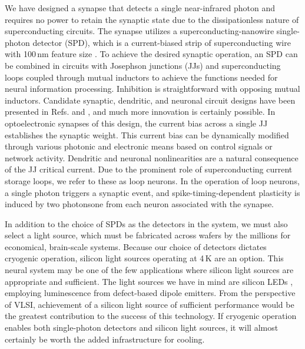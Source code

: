 \documentclass[twocolumn]{article}
\newcommand{\onlinecite}[1]{\hspace{-1 ex} \nocite{#1}\citenum{#1}}
\begin{document}
We have designed a synapse that detects a single near-infrared photon and requires no power to retain the synaptic state due to the dissipationless nature of superconducting circuits. The synapse utilizes a superconducting-nanowire single-photon detector (SPD), which is a current-biased strip of superconducting wire with 100\,nm feature size \cite{mave2013}. To achieve the desired synaptic operation, an SPD can be combined in circuits with Josephson junctions (JJs) and superconducting loops coupled through mutual inductors to achieve the functions needed for neural information processing. Inhibition is straightforward with opposing mutual inductors. Candidate synaptic, dendritic, and neuronal circuit designs have been presented in Refs. \onlinecite{sh2018} and \onlinecite{sh2019_fluxonic}, and much more innovation is certainly possible. In optoelectronic synapses of this design, the current bias across a single JJ establishes the synaptic weight. This current bias can be dynamically modified through various photonic and electronic means based on control signals or network activity. Dendritic and neuronal nonlinearities are a natural consequence of the JJ critical current. Due to the prominent role of superconducting current storage loops, we refer to these as loop neurons. In the operation of loop neurons, a single photon triggers a synaptic event, and spike-timing-dependent plasticity is induced by two photons\textemdash one from each neuron associated with the synapse.

In addition to the choice of SPDs as the detectors in the system, we must also select a light source, which must be fabricated across wafers by the millions for economical, brain-scale systems. Because our choice of detectors dictates cryogenic operation, silicon light sources operating at 4\,K are an option. This neural system may be one of the few applications where silicon light sources are appropriate and sufficient. The light sources we have in mind are silicon LEDs \cite{buch2017}, employing luminescence from defect-based dipole emitters. From the perspective of VLSI, achievement of a silicon light source of sufficient performance would be the greatest contribution to the success of this technology. If cryogenic operation enables both single-photon detectors and silicon light sources, it will almost certainly be worth the added infrastructure for cooling.
\end{document}
